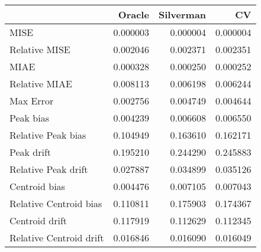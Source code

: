 \begin{tabular}{lrrr}
  \hline
 & Oracle & Silverman & CV \\ 
  \hline
MISE & 0.000003 & 0.000004 & 0.000004 \\ 
  Relative MISE & 0.002046 & 0.002371 & 0.002351 \\ 
  MIAE & 0.000328 & 0.000250 & 0.000252 \\ 
  Relative MIAE & 0.008113 & 0.006198 & 0.006244 \\ 
  Max Error & 0.002756 & 0.004749 & 0.004644 \\ 
  Peak bias & 0.004239 & 0.006608 & 0.006550 \\ 
  Relative Peak bias & 0.104949 & 0.163610 & 0.162171 \\ 
  Peak drift & 0.195210 & 0.244290 & 0.245883 \\ 
  Relative Peak drift & 0.027887 & 0.034899 & 0.035126 \\ 
  Centroid bias & 0.004476 & 0.007105 & 0.007043 \\ 
  Relative Centroid bias & 0.110811 & 0.175903 & 0.174367 \\ 
  Centroid drift & 0.117919 & 0.112629 & 0.112345 \\ 
  Relative Centroid drift & 0.016846 & 0.016090 & 0.016049 \\ 
   \hline
\end{tabular}
